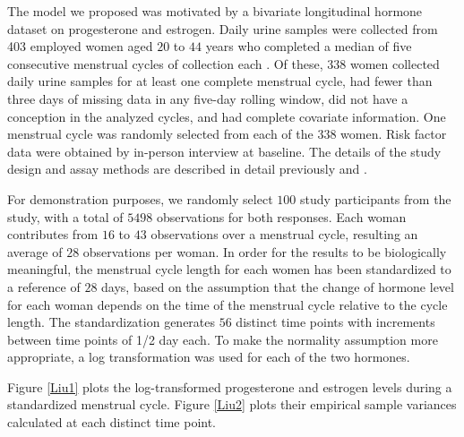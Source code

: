 \documentclass[article,lineno]{biometrika}
\begin{document}
The model we proposed was motivated by a bivariate longitudinal hormone dataset on progesterone and estrogen.
Daily urine samples were collected from 403 employed women aged $20$ to $44$ years who completed a median of five consecutive menstrual cycles of collection each \cite{Gold:Eske:Lasl:Samu:O'Nei:Over:Sche:quan:1995}. Of these, $338$ women collected daily urine samples for at least one complete menstrual cycle, had fewer than three days of missing data in any five-day rolling window, did not have a conception in the analyzed cycles, and had complete covariate information. One menstrual cycle was randomly selected from each of the $338$ women. 
Risk factor data were obtained by in-person interview at baseline. The details of the study design and assay methods are described in detail previously \cite{Gold:Eske:Lasl:Samu:O'Nei:Over:Sche:quan:1995} and \cite{Gold:Eske:Hamm:Lasl:Samu:O'Nei:Hine:Over:Sche:quan:1995}. 

For demonstration purposes, we randomly select  $100$ study participants from the study, with a total of $5498$ observations for both responses. 
Each woman contributes from $16$ to $43$ observations over a menstrual cycle, resulting an average of $28$ observations per woman.
In order for the results to be biologically meaningful, the menstrual cycle length for each women has been standardized to a reference of $28$ days, based on the assumption that the change of hormone level for each woman depends on the time of the menstrual cycle relative to the cycle length. The standardization generates $56$ distinct time points with increments between time points of 1/2 day each. To make the normality assumption more appropriate, a log transformation was used for each of the two hormones. 

Figure \ref{Liu1} plots the log-transformed progesterone and estrogen levels during a standardized menstrual cycle. Figure \ref{Liu2} plots their empirical sample variances calculated at each distinct time point. 


\end{document}
